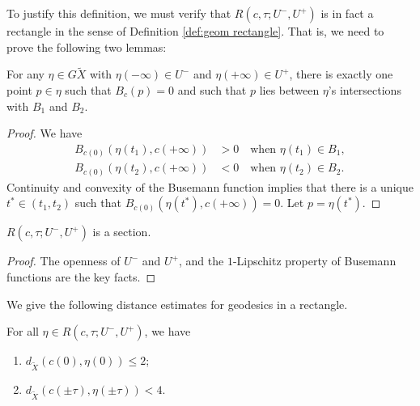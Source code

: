 To justify this definition, we must verify that $R(c, \tau; U^-, U^+)$ is in fact a rectangle in the sense of Definition \ref{def:geom rectangle}. That is, we need to prove the following two lemmas:

\begin{lem} \label{sectionproof}
For any $\eta \in G\tilde X$ with $\eta(-\infty) \in U^-$ and $\eta(+\infty) \in U^+$, there is exactly one point $p \in \eta$ such that $B_{c}(p)=0$ and such that $p$ lies between $\eta$'s intersections with $B_1$ and $B_2$.
\end{lem}

\begin{proof}
We have
\begin{align*}
B_{c(0)}(\eta(t_1),c(+\infty))&>0\quad \text{when }\eta(t_1)\in B_1,\\
B_{c(0)}(\eta(t_2),c(+\infty))&<0\quad \text{when }\eta(t_2)\in B_2. 
\end{align*}
Continuity and convexity of the Busemann function implies that there is a unique $t^*\in (t_1, t_2)$ such that $B_{c(0)}(\eta(t^*),c(+\infty))=0$. Let $p=\eta(t^*)$.
\end{proof}
\begin{lem}
$R(c, \tau; U^-, U^+)$ is a section.
\end{lem}
\begin{proof}
The openness of $U^-$ and $U^+$, and the $1$-Lipschitz property of Busemann functions are the key facts.
\end{proof}

We give the following distance estimates for geodesics in a rectangle.

\begin{lem} \label{l.distance}
For all $\eta \in R(c, \tau; U^-, U^+)$, we have
\begin{enumerate}
\item\label{l.distance1} $d_{\tilde X}(c(0), \eta(0))\leq 2$;
\item\label{l.distance2} $d_{\tilde X}(c( \pm \tau), \eta(\pm \tau))<4$.
\end{enumerate}
\end{lem}

